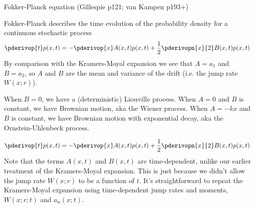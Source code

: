 \documentclass{beamer}
\begin{document}
% 

\begin{frame}{}

  Fokker-Planck equation (Gillespie p121; van Kampen p193+)

  Fokker-Planck describes the time evolution of the probability density for a continuous stochastic process
\[
\pderivop{t} p(x,t) = -\pderivop{x} A(x,t)p(x,t) + \frac{1}{2} \pderivopn{x}{2} B(x,t)p(x,t)
\]
  By comparison with the Kramers-Moyal expansion we see that $A=a_1$ and $B=a_2$,
so $A$ and $B$ are the mean and variance of the drift (i.e. the jump rate $W(x;r)$).
  
   When $B=0$, we have a (deterministic) Liouville process.
   When $A=0$ and $B$ is constant, we have Brownian motion, aka the Wiener process.
   When $A=-kx$ and $B$ is constant, we have Brownian motion with exponential decay, aka the Ornstein-Uhlenbeck process.
  
\end{frame}
\begin{frame}{}
\[
\pderivop{t} p(x,t) = -\pderivop{x} A(x,t)p(x,t) + \frac{1}{2} \pderivopn{x}{2} B(x,t)p(x,t)
\]
  Note that the terms $A(x,t)$ and $B(x,t)$ are time-dependent, unlike our earlier treatment of the Kramers-Moyal expansion.
This is just because we didn't allow the jump rate $W(x;r)$ to be a function of $t$.
It's straightforward to repeat the Kramers-Moyal expansion using time-dependent jump rates and moments, $W(x;r;t)$ and $a_n(x;t)$.
 
\end{frame}
\end{document}
